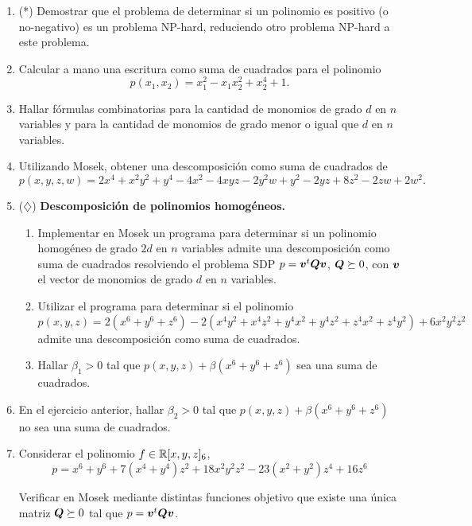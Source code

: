 \documentclass[11pt]{article}
\begin{document}
\begin{enumerate}
\item (*) Demostrar que el problema de determinar si un polinomio es positivo (o no-negativo) es un problema NP-hard, reduciendo otro problema NP-hard a este problema.

\item Calcular a mano una escritura como suma de cuadrados para el polinomio
$$
p(x_1, x_2) = x_1^2 - x_1 x_2^2 + x_2^4 + 1.
$$

\item Hallar fórmulas combinatorias para la cantidad de monomios de grado $d$ en $n$ variables y para la cantidad de monomios de grado menor o igual que $d$ en $n$ variables.

\item Utilizando Mosek, obtener una descomposición como suma de cuadrados de
$$
p(x,y,z,w) = 2x^4 + x^2y^2 + y^4 - 4x^2 - 4xyz - 2y^2w + y^2 - 2yz + 8z^2 - 2zw + 2w^2.
$$
    
\item ($\diamondsuit$) \textbf{Descomposición de polinomios homogéneos.}

\begin{enumerate}
\item Implementar en Mosek un programa para determinar si un polinomio homogéneo de grado $2d$ en $n$ variables admite una descomposición como suma de cuadrados resolviendo el problema SDP $p = \bm{v}^t \bm{Q} \bm{v}$, $\bm{Q} \succeq 0$, con $\bm{v}$ el vector de monomios de grado $d$ en $n$ variables.
\item Utilizar el programa para determinar si el polinomio 
$$
p(x,y,z) = 2(x^6 + y^6 + z^6) - 2(x^4y^2 + x^4z^2 + y^4x^2 + y^4z^2 + z^4x^2 + z^4y^2) + 6x^2y^2z^2
$$
admite una descomposición como suma de cuadrados.

\item Hallar $\beta_1 > 0$ tal que $p(x,y,z) + \beta(x^6 + y^6 + z^6)$ sea una suma de cuadrados.
\end{enumerate}

\item En el ejercicio anterior, hallar $\beta_2 > 0$ tal que $p(x,y,z) + \beta(x^6 + y^6 + z^6)$ no sea una suma de cuadrados.

\item Considerar el polinomio $f \in \mathbb{R}[x,y,z]_6$,
$$
p=x^6 + y^6 + 7(x^4 + y^4)z^2 + 18x^2y^2z^2 - 23(x^2 + y^2) z^4 + 16 z^6
$$

Verificar en Mosek mediante distintas funciones objetivo que existe una única matriz $\bm{Q} \succeq 0$ tal que $p = \bm{v}^t \bm{Q} \bm{v}$.


\end{enumerate}
\end{document}
